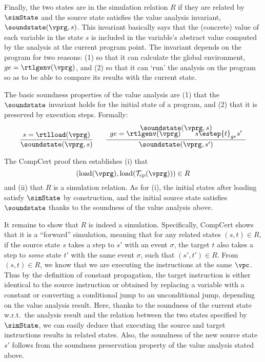 Finally, the two states are in the simulation relation $R$
if they are related by $\simState$ and 
the source state satisfies the value analysis invariant, $\soundstate(\vprg,s)$.
This invariant basically says that the (concrete) value of each variable in the state $s$ is included in the variable's abstract value computed by the analysis at the current program point.
The invariant depends on the program for two reasons:
(1) so that it can calculate the global environment, $ge=\rtlgenv(\vprg)$, and
(2) so that it can `run' the analysis on the program so as to be able to compare its results with the current state.


The basic soundness properties of the value analysis are
(1) that the $\soundstate$ invariant holds for the initial state of a program, and
(2) that it is preserved by execution steps.
Formally:
\[
\frac{s = \rtlload(\vprg)}{
  \soundstate(\vprg,s)
}
\quad~~
\frac{ 
\begin{array}{c}
  \soundstate(\vprg,s) \\[-4pt]
  ge = \rtlgenv(\vprg)  \qquad
  s \estep{t}_{ge} s' 
\end{array}
}{
  \soundstate(\vprg,s')
}
\]

The CompCert proof then establishes (i) that
\[(\mathrm{load}(\vprg),\mathrm{load}(\mathcal{T}_\mathrm{cp}(\vprg)))\in
R\] and (ii) that $R$ is a simulation relation. As for (i), the
initial states after loading satisfy $\simState$ by construction, and
the initial source state satisfies $\soundstate$ thanks to the
soundness of the value analysis above.

It remains to show that $R$ is indeed a simulation.  Specifically,
CompCert shows that it is a ``forward'' simulation, meaning that for
any related states $(s,t)\in R$, if the source state $s$ takes a step
to $s'$ with an event $\sigma$, the target $t$ also takes a step to
\emph{some} state $t'$ with the same event $\sigma$, such that $(s',t')
\in R$.  From $(s,t)\in R$, we know that we are executing the
instructions at the same $\vpc$. Thus by the definition of constant
propagation, the target instruction is either identical to the source
instruction or obtained by replacing a variable with a constant or
converting a conditional jump to an unconditional jump, depending on
the value analysis result.  Here, thanks to the soundness of the
current state w.r.t.\ the analysis result and the relation between the
two states specified by $\simState$, we can easily deduce that
executing the source and target instructions results in related
states.  Also, the soundness of the new source state $s'$ follows
from the soundness preservation property of the value analysis stated
above.

